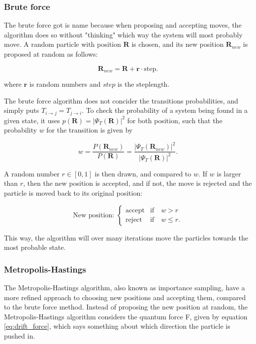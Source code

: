 \documentclass[norsk,a4paper,12pt]{article}
\begin{document}
\subsubsection{Brute force}
The brute force got is name because when proposing and accepting moves, the algorithm does so without "thinking" which way the system will most probably move. A random particle with position $\boldsymbol{R}$ is chosen, and its new position $\boldsymbol{R}_{new}$ is proposed at random as follows:

\begin{equation}
\boldsymbol{R}_{new} = \boldsymbol{R} + \boldsymbol{r}\cdot \text{step}.
\end{equation}

where $\boldsymbol{r}$ is random numbers and $step$ is the steplength.
\par 
\vspace{3mm}
The brute force algorithm does not concider the transitions probabilities, and simply puts $T_{i\rightarrow j} = T_{j\rightarrow i}$. To check the probability of a system being found in a given state, it uses $p(\boldsymbol{R})=|\Psi_T(\boldsymbol{R})|^2$ for both position, such that the probability $w$ for the transition is given by

\begin{equation}
w=\frac{P(\boldsymbol{R}_{new})}{P(\boldsymbol{R})}=\frac{|\Psi_T(\boldsymbol{R}_{new})|^2}{|\Psi_T(\boldsymbol{R})|^2}.
\end{equation}

A random number $r \in [0,1]$ is then drawn, and compared to $w$. If $w$ is larger than $r$, then the new position is accepted, and if not, the move is rejected and the particle is moved back to its original position:

\begin{equation}
\text{New position: }
\begin{cases} 
\text{accept} & \text{if}\quad w > r \\
\text{reject} & \text{if}\quad w \leq r.
\end{cases}
\end{equation}

This way, the algorithm will over many iterations move the particles towards the most probable state.


\subsubsection{Metropolis-Hastings}
The Metropolis-Hastings algorithm, also known as importance sampling, have a more refined approach to choosing new positions and accepting them, compared to the brute force method. Instead of proposing the new position at random, the Metropolis-Hastings algorithm considers the quantum force F, given by equation \ref{eq:drift_force}, which says something about which direction the particle is pushed in. 
\end{document}
